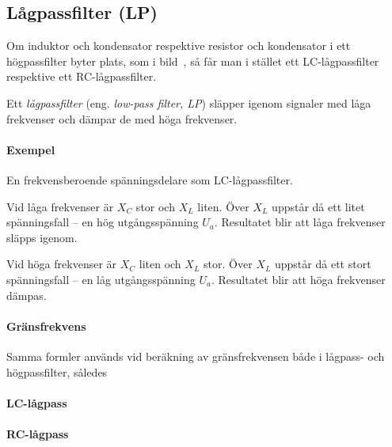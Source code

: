 \subsection{Lågpassfilter (LP)}
\label{lågpassfilter}


Om induktor och kondensator respektive resistor och kondensator i ett
högpassfilter byter plats, som i bild~, så får man i
stället ett LC-lågpassfilter respektive ett RC-lågpassfilter.

Ett \emph{lågpassfilter} (eng. \emph{low-pass filter, LP}) släpper igenom
signaler med låga frekvenser och dämpar de med höga frekvenser.

\paragraph{Exempel} En frekvensberoende spänningsdelare som LC-lågpassfilter.

Vid låga frekvenser är \(X_C\) stor och \(X_L\) liten.
Över \(X_L\) uppstår då ett litet spänningsfall -- en hög utgångsspänning
\(U_a\).
Resultatet blir att låga frekvenser släpps igenom.

Vid höga frekvenser är \(X_C\) liten och \(X_L\) stor.
Över \(X_L\) uppstår då ett stort spänningsfall -- en låg utgångsspänning
\(U_a\).
Resultatet blir att höga frekvenser dämpas.

\paragraph{Gränsfrekvens}

Samma formler används vid beräkning av gränsfrekvensen både i lågpass- och
högpassfilter, således

\paragraph{LC-lågpass}

\paragraph{RC-lågpass}

